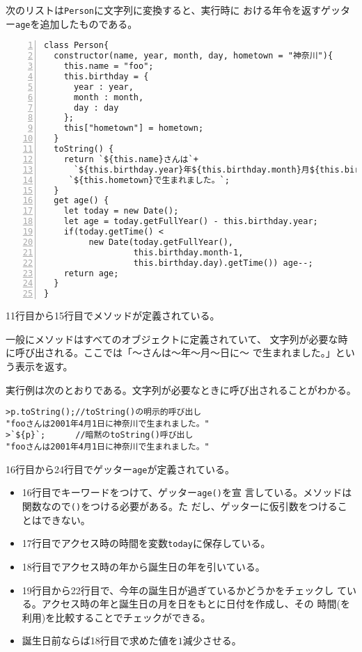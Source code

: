 \begin{Exec}\upshape\label{PersonWidthGetter}
次のリストは\texttt{Person}に文字列に変換すると、実行時に
 おける年令を返すゲッター\texttt{age}を追加したものである。
\begin{Verbatim}[numbers=left]
class Person{
  constructor(name, year, month, day, hometown = "神奈川"){
    this.name = "foo";
    this.birthday = {
      year : year,
      month : month,
      day : day
    };
    this["hometown"] = hometown;
  }
  toString() {
    return `${this.name}さんは`+
      `${this.birthday.year}年${this.birthday.month}月${this.birthday.day}日に` +
     `${this.hometown}で生まれました。`;
  }
  get age() {
    let today = new Date();
    let age = today.getFullYear() - this.birthday.year;
    if(today.getTime() <
         new Date(today.getFullYear(),
                  this.birthday.month-1,
                  this.birthday.day).getTime()) age--;
    return age;
  }
}
\end{Verbatim}
 11行目から15行目でメソッドが定義されている。

 一般にメソッドはすべてのオブジェクトに定義されていて、
 文字列が必要な時に呼び出される。ここでは「～さんは～年～月～日に～
        で生まれました。」という表示を返す。

実行例は次のとおりである。文字列が必要なときに呼び出されることがわかる。
\begin{Verbatim}
>p.toString();//toString()の明示的呼び出し
"fooさんは2001年4月1日に神奈川で生まれました。"
>`${p}`;      //暗黙のtoString()呼び出し
"fooさんは2001年4月1日に神奈川で生まれました。"
\end{Verbatim}
 16行目から24行目でゲッター\texttt{age}が定義されている。
 \begin{itemize}
 \item 16行目でキーワードをつけて、ゲッター\texttt{age()}を宣
       言している。メソッドは関数なので\texttt{()}をつける必要がある。た
       だし、ゲッターに仮引数をつけることはできない。
 \item 17行目でアクセス時の時間を変数\texttt{today}に保存している。
 \item 18行目でアクセス時の年から誕生日の年を引いている。
 \item 19行目から22行目で、今年の誕生日が過ぎているかどうかをチェックし
       ている。アクセス時の年と誕生日の月を日をもとに日付を作成し、その
       時間(を利用)を比較することでチェックができる。
 \item 誕生日前ならば18行目で求めた値を$1$減少させる。
 \end{itemize}
\end{Exec}
